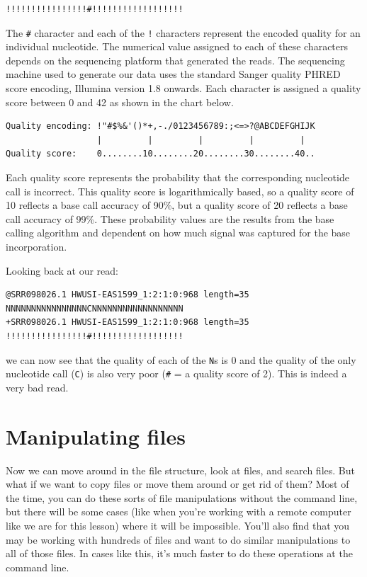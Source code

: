 \documentclass[
  letterpaper,
  DIV=11,
  numbers=noendperiod]{scrreprt}
\begin{document}
\begin{verbatim}
!!!!!!!!!!!!!!!!#!!!!!!!!!!!!!!!!!!
\end{verbatim}

The \texttt{\#} character and each of the \texttt{!} characters
represent the encoded quality for an individual nucleotide. The
numerical value assigned to each of these characters depends on the
sequencing platform that generated the reads. The sequencing machine
used to generate our data uses the standard Sanger quality PHRED score
encoding, Illumina version 1.8 onwards. Each character is assigned a
quality score between 0 and 42 as shown in the chart below.

\begin{verbatim}
Quality encoding: !"#$%&'()*+,-./0123456789:;<=>?@ABCDEFGHIJK
                  |         |         |         |         |
Quality score:    0........10........20........30........40..                          
\end{verbatim}

Each quality score represents the probability that the corresponding
nucleotide call is incorrect. This quality score is logarithmically
based, so a quality score of 10 reflects a base call accuracy of 90\%,
but a quality score of 20 reflects a base call accuracy of 99\%. These
probability values are the results from the base calling algorithm and
dependent on how much signal was captured for the base incorporation.

Looking back at our read:

\begin{verbatim}
@SRR098026.1 HWUSI-EAS1599_1:2:1:0:968 length=35
NNNNNNNNNNNNNNNNCNNNNNNNNNNNNNNNNNN
+SRR098026.1 HWUSI-EAS1599_1:2:1:0:968 length=35
!!!!!!!!!!!!!!!!#!!!!!!!!!!!!!!!!!!
\end{verbatim}

we can now see that the quality of each of the \texttt{N}s is 0 and the
quality of the only nucleotide call (\texttt{C}) is also very poor
(\texttt{\#} = a quality score of 2). This is indeed a very bad read.

\section{Manipulating files}\label{manipulating-files}

Now we can move around in the file structure, look at files, and search
files. But what if we want to copy files or move them around or get rid
of them? Most of the time, you can do these sorts of file manipulations
without the command line, but there will be some cases (like when you're
working with a remote computer like we are for this lesson) where it
will be impossible. You'll also find that you may be working with
hundreds of files and want to do similar manipulations to all of those
files. In cases like this, it's much faster to do these operations at
the command line.
\end{document}

